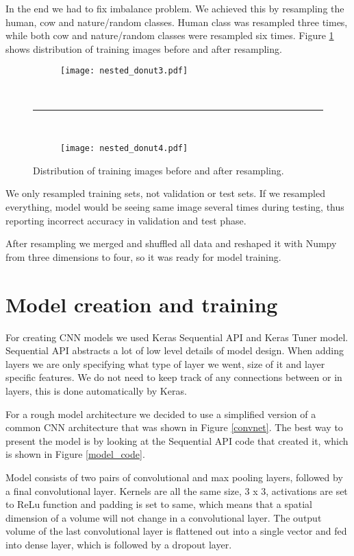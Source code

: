In the end we had to fix imbalance problem.
We achieved this by resampling the human, cow and nature/random classes.
Human class was resampled three times, while both cow and nature/random classes were resampled six times.
Figure \ref{resampled} shows distribution of training images before and after resampling.

\begin{figure}[ht] 
    \begin{subfigure}[b]{1\textwidth}
        \centering
        \texttt{[image: nested\_donut3.pdf]} 
    \end{subfigure}
    \unskip\ \hrule\ 
    \begin{subfigure}[b]{1\textwidth}
        \centering
        \texttt{[image: nested\_donut4.pdf]} 
    \end{subfigure}
    
    \caption{ Distribution of training images before and after resampling.}
    \label{resampled}
\end{figure}

We only resampled training sets, not validation or test sets.
If we resampled everything, model would be seeing same image several times during testing, thus reporting incorrect accuracy in validation and test phase.

After resampling we merged and shuffled all data and reshaped it with Numpy from three dimensions to four, so it was ready for model training.


\section{ Model creation and training}\label{cnn_ref}

For creating CNN models we used Keras Sequential API and Keras Tuner model.
Sequential API abstracts a lot of low level details of model design.
When adding layers we are only specifying what type of layer we went, size of it and layer specific features. 
We do not need to keep track of any connections between or in layers, this is done automatically by Keras.

For a rough model architecture we decided to use a simplified version of a common CNN architecture that was shown in Figure \ref{convnet}.
The best way to present the model is by looking at the Sequential API code that created it, which is shown in Figure \ref{model_code}.

Model consists of two pairs of convolutional and max pooling layers, followed by a final convolutional layer.
Kernels are all the same size, 3 x 3, activations are set to ReLu function and padding is set to same, which means that a spatial dimension of a volume will not change in a convolutional layer.
The output volume of the last convolutional layer is flattened out into a single vector and fed into dense layer, which is followed by a dropout layer\footnotemark.

